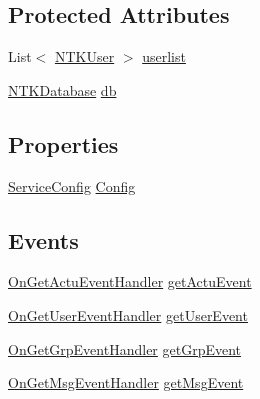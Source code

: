 \subsection*{Protected Attributes}
\begin{DoxyCompactItemize}
\item 
List$<$ \mbox{\hyperlink{class_n_t_k_1_1_n_t_k_user}{N\+T\+K\+User}} $>$ \mbox{\hyperlink{class_n_t_k_1_1_service_1_1_n_t_k_service_a14977c798a805fea99802fa40da31aa0}{userlist}}
\item 
\mbox{\hyperlink{class_n_t_k_1_1_database_1_1_n_t_k_database}{N\+T\+K\+Database}} \mbox{\hyperlink{class_n_t_k_1_1_service_1_1_n_t_k_service_a68903e0a461b9bb373db39304e3ad9be}{db}}
\end{DoxyCompactItemize}
\subsection*{Properties}
\begin{DoxyCompactItemize}
\item 
\mbox{\hyperlink{struct_n_t_k_1_1_service_1_1_service_config}{Service\+Config}} \mbox{\hyperlink{class_n_t_k_1_1_service_1_1_n_t_k_service_a8951201ce7777c41ae79ca97ce45bf12}{Config}}
\end{DoxyCompactItemize}
\subsection*{Events}
\begin{DoxyCompactItemize}
\item 
\mbox{\hyperlink{namespace_n_t_k_1_1_service_aaea6a2e360a41254ddf2d5459fd2135f}{On\+Get\+Actu\+Event\+Handler}} \mbox{\hyperlink{class_n_t_k_1_1_service_1_1_n_t_k_service_a42f9e6ae44394f4f91f08eca21aa9144}{get\+Actu\+Event}}
\item 
\mbox{\hyperlink{namespace_n_t_k_1_1_service_a51bf57675f3325cb27da64ad2987252b}{On\+Get\+User\+Event\+Handler}} \mbox{\hyperlink{class_n_t_k_1_1_service_1_1_n_t_k_service_a469c4b12ce0ec00a7ec292bcb3a2aa95}{get\+User\+Event}}
\item 
\mbox{\hyperlink{namespace_n_t_k_1_1_service_ad014f00ab4e82ad6ce8808bb063f8b31}{On\+Get\+Grp\+Event\+Handler}} \mbox{\hyperlink{class_n_t_k_1_1_service_1_1_n_t_k_service_ab99ac40fc03f97052638ef3a2297157e}{get\+Grp\+Event}}
\item 
\mbox{\hyperlink{namespace_n_t_k_1_1_service_a937b2f893bc924fb0e8aaeac52f0f18e}{On\+Get\+Msg\+Event\+Handler}} \mbox{\hyperlink{class_n_t_k_1_1_service_1_1_n_t_k_service_a35f5c3965b620753a16a413fcea7a2d4}{get\+Msg\+Event}}
\end{DoxyCompactItemize}


